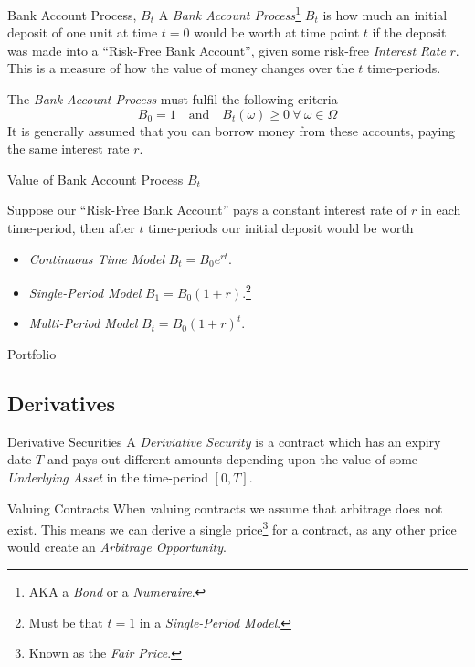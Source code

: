 \documentclass[11pt,a4paper]{article}
\begin{document}
  \begin{definition}{Bank Account Process, $B_t$}
    A \textit{Bank Account Process}\footnote{AKA a \textit{Bond} or a \textit{Numeraire}.} $B_t$ is how much an initial deposit of one unit at time $t=0$ would be worth at time point $t$ if the deposit was made into a ``Risk-Free Bank Account'', given some risk-free \textit{Interest Rate} $r$. This is a measure of how the value of money changes over the $t$ time-periods.
    \par The \textit{Bank Account Process} must fulfil the following criteria
    \[ B_0=1\quad\text{and}\quad B_t(\omega)\geq0\ \forall\ \omega\in\Omega \]
    It is generally assumed that you can borrow money from these accounts, paying the same interest rate $r$.
  \end{definition}

  \begin{proposition}{Value of Bank Account Process $B_t$}
    \par Suppose our ``Risk-Free Bank Account'' pays a constant interest rate of $r$ in each time-period, then after $t$ time-periods our initial deposit would be worth
    \begin{itemize}
      \item \textit{Continuous Time Model} $B_t=B_0e^{rt}$.
      \item \textit{Single-Period Model} $B_1=B_0(1+r)$.\footnote{Must be that $t=1$ in a \textit{Single-Period Model}.}
      \item \textit{Multi-Period Model} $B_t=B_0(1+r)^t$.
    \end{itemize}
  \end{proposition}

  \begin{definition}{Portfolio}
  \end{definition}

\subsection{Derivatives}

  \begin{definition}{Derivative Securities}
    A \textit{Deriviative Security} is a contract which has an expiry date $T$ and pays out different amounts depending upon the value of some \textit{Underlying Asset} in the time-period $[0,T]$.
  \end{definition}

  \begin{remark}{Valuing Contracts}
    When valuing contracts we assume that arbitrage does not exist. This means we can derive a single price\footnote{Known as the \textit{Fair Price}.} for a contract, as any other price would create an \textit{Arbitrage Opportunity}.
  \end{remark}
\end{document}
